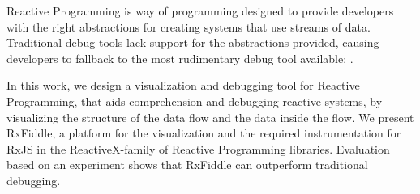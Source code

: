 Reactive Programming is way of programming designed to provide developers with the right abstractions for creating systems that use streams of data.
Traditional debug tools lack support for the abstractions provided, causing developers to fallback to the most rudimentary debug tool available: \printfdebugging{}.

In this work, we design a visualization and debugging tool for Reactive Programming, that aids comprehension and debugging reactive systems, by visualizing the structure of the data flow and the data inside the flow.
We present RxFiddle, a platform for the visualization and the required instrumentation for RxJS in the ReactiveX-family of Reactive Programming libraries.
Evaluation based on an experiment shows that RxFiddle can outperform traditional debugging.

